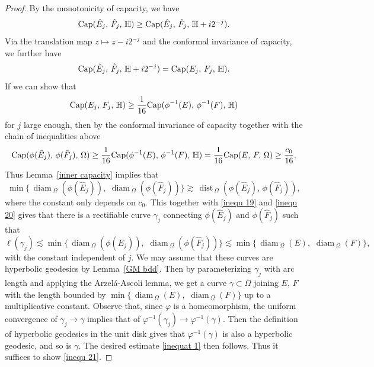\documentclass[reqno,11pt]{amsart}
\def\dist{{\mathop\mathrm{\,dist\,}}}
\def\ls{\lesssim}
\def\diam{{\mathop\mathrm{\,diam\,}}}
\numberwithin{equation}{section}
\theoremstyle{remark}
\begin{document}
\begin{proof}
By the monotonicity of capacity, we have
$${\rm Cap}(\hat E_j,\,\hat F_j,\, \mathbb H)\ge {\rm Cap}(\hat E_j,\,\hat F_j,\, \mathbb H + i 2^{-j}  ). $$ 
Via the translation map $z\mapsto  z - i2^{-j}$ and the conformal invariance of capacity, we further have
$${\rm Cap}(\hat E_j,\, \hat F_j,\, \mathbb H + i 2^{-j} )={\rm Cap}(E_j,\, F_j,\,  \mathbb H). $$
 If we can show that
\begin{equation}\label{inequ 21}
{\rm Cap}(E_j,\, F_j,\,  \mathbb H)\ge \frac 1 {16} {\rm Cap}(\phi^{-1}(E) ,\, \phi^{-1}(F) ,\,  \mathbb H)
\end{equation}
for $j$ large enough, then by the conformal invariance of capacity together with the chain of inequalities above
$$ {\rm Cap}(\phi(\hat E_j),\,\phi(\hat F_j),\,\Omega )\ge \frac 1 {16} {\rm Cap}(\phi^{-1}(E) ,\, \phi^{-1}(F) ,\,  \mathbb H)= \frac 1 {16} {\rm Cap}( E ,\,  F  ,\,  \Omega)\ge \frac {c_0} {16}.$$
Thus Lemma~\ref{inner capacity} implies that
$${\min\{\diam_{\Omega}(\phi(\hat E_j)),\,\diam_{\Omega}(\phi(\hat F_j))\}}\gtrsim {\dist_{\Omega}(\phi(\hat E_j),\,\phi(\hat F_j))}, $$
where the constant only depends on $c_0$.
This together with \eqref{inequ 19} and  \eqref{inequ 20} gives that there is a rectifiable curve 
$\gamma_j$ connecting $\phi(\hat E_j)$ and $\phi(\hat F_j)$ such that
$$\ell(\gamma_j)\lesssim {\min\{\diam_{\Omega}(\phi(\hat E_j)),\,\diam_{\Omega}(\phi(\hat F_j))\}}\ls \min\{\diam_{\Omega}(E),\,\diam_{\Omega}(F)\},$$
with the constant independent of $j$. 
We may assume that these curves are hyperbolic geodesics by Lemma~\ref{GM bdd}.
Then by parameterizing $\gamma_j$ with arc length and applying the Arzel\'a-Ascoli lemma, we get a  curve $\gamma\subset \overline{\Omega}$ joining $E,\,F$ with the length bounded by $\min\{\diam_{\Omega}(E),\,\diam_{\Omega}(F)\}$ up to a multiplicative constant. Observe that, since $\varphi$ is a homeomorphism, the uniform convergence of $\gamma_j\to \gamma$ implies that of $\varphi^{-1}(\gamma_j)\to \varphi^{-1}(\gamma)$. Then the definition of hyperbolic geodesics in the unit disk gives that $\varphi^{-1}(\gamma)$ is also a hyperbolic geodesic, and so is  $\gamma$. 
The desired estimate \eqref{inequat 1} then follows. 
Thus it suffices to show \eqref{inequ 21}. 




\end{proof}
\end{document}
